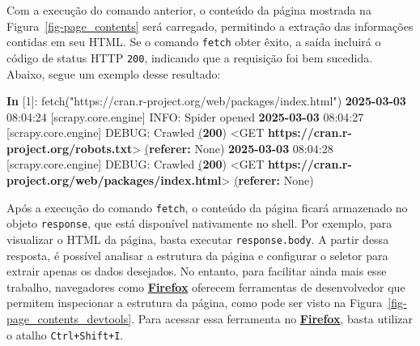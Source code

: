 \documentclass[
  12pt,
  a4paper,
]{scrreprt}
\newenvironment{Shaded}{}{}
\newcommand{\ErrorTok}[1]{\textcolor[rgb]{1.00,0.33,0.33}{\underline{#1}}}
\newcommand{\ExtensionTok}[1]{\textcolor[rgb]{0.84,0.23,0.29}{\textbf{#1}}}
\newcommand{\KeywordTok}[1]{\textcolor[rgb]{0.84,0.23,0.29}{#1}}
\newcommand{\NormalTok}[1]{\textcolor[rgb]{0.14,0.16,0.18}{#1}}
\newcommand{\OperatorTok}[1]{\textcolor[rgb]{0.14,0.16,0.18}{#1}}
\newcommand{\PreprocessorTok}[1]{\textcolor[rgb]{0.84,0.23,0.29}{#1}}
\newcommand{\SpecialStringTok}[1]{\textcolor[rgb]{0.01,0.18,0.38}{#1}}
\newcommand{\StringTok}[1]{\textcolor[rgb]{0.01,0.18,0.38}{#1}}
\begin{document}
\vspace{12pt}

Com a execução do comando anterior, o conteúdo da página mostrada na
Figura~\ref{fig-page_contents} será carregado, permitindo a extração das
informações contidas em seu HTML. Se o comando \texttt{fetch} obter
êxito, a saída incluirá o código de status HTTP \texttt{200}, indicando
que a requisição foi bem sucedida. Abaixo, segue um exemplo desse
resultado:

\begin{Shaded}
\begin{Highlighting}[]
\ExtensionTok{In} \PreprocessorTok{[}\SpecialStringTok{1}\PreprocessorTok{]}\NormalTok{: fetch}\ErrorTok{(}\StringTok{"https://cran.r{-}project.org/web/packages/index.html"}\KeywordTok{)}
\ExtensionTok{2025{-}03{-}03}\NormalTok{ 08:04:24 }\PreprocessorTok{[}\SpecialStringTok{scrapy.core.engine}\PreprocessorTok{]}\NormalTok{ INFO: Spider opened}
\ExtensionTok{2025{-}03{-}03}\NormalTok{ 08:04:27 }\PreprocessorTok{[}\SpecialStringTok{scrapy.core.engine}\PreprocessorTok{]}\NormalTok{ DEBUG: Crawled }\ErrorTok{(}\ExtensionTok{200}\KeywordTok{)} \OperatorTok{\textless{}}\NormalTok{GET}
\ExtensionTok{https://cran.r{-}project.org/robots.txt}\OperatorTok{\textgreater{}} \ErrorTok{(}\ExtensionTok{referer:}\NormalTok{ None}\KeywordTok{)}
\ExtensionTok{2025{-}03{-}03}\NormalTok{ 08:04:28 }\PreprocessorTok{[}\SpecialStringTok{scrapy.core.engine}\PreprocessorTok{]}\NormalTok{ DEBUG: Crawled }\ErrorTok{(}\ExtensionTok{200}\KeywordTok{)} \OperatorTok{\textless{}}\NormalTok{GET}
\ExtensionTok{https://cran.r{-}project.org/web/packages/index.html}\OperatorTok{\textgreater{}} \ErrorTok{(}\ExtensionTok{referer:}\NormalTok{ None}\KeywordTok{)}
\end{Highlighting}
\end{Shaded}

Após a execução do comando \texttt{fetch}, o conteúdo da página ficará
armazenado no objeto \texttt{response}, que está disponível nativamente
no shell. Por exemplo, para visualizar o HTML da página, basta executar
\texttt{response.body}. A partir dessa resposta, é possível analisar a
estrutura da página e configurar o seletor para extrair apenas os dados
desejados. No entanto, para facilitar ainda mais esse trabalho,
navegadores como
\href{https://www.mozilla.org/pt-BR/firefox/}{\textbf{Firefox}} oferecem
ferramentas de desenvolvedor que permitem inspecionar a estrutura da
página, como pode ser visto na Figura~\ref{fig-page_contents_devtools}.
Para acessar essa ferramenta no
\href{https://www.mozilla.org/pt-BR/firefox/}{\textbf{Firefox}}, basta
utilizar o atalho \texttt{Ctrl+Shift+I}.
\end{document}
